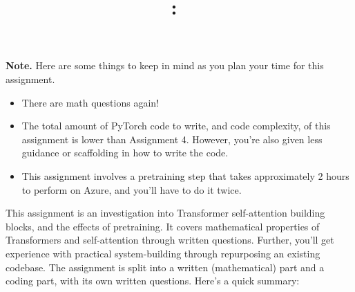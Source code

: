 \documentclass[answers]{exam}
\title{
    \textmd{\textbf{\hmwkClass:\ \hmwkTitle}}
}
\author{}
\date{}
\begin{document}
    \vspace{-1in}

    \maketitle

    \vspace{-0.5in}


    \begin{framed}
        \noindent
        \textbf{Note.} Here are some things to keep in mind as you plan your time for this assignment.
        \begin{itemize}
            \item There are math questions again!
            \item The total amount of PyTorch code to write, and code complexity, of this assignment is lower than Assignment 4.
            However, you're also given less guidance or scaffolding in how to write the code.
            \item  This assignment involves a pretraining step that takes approximately 2 hours to perform on Azure, and you'll have to do it twice.
        \end{itemize}
    \end{framed}
    This assignment is an investigation into Transformer self-attention building blocks, and the effects of pretraining.
    It covers mathematical properties of Transformers and self-attention through written questions.
    Further, you'll get experience with practical system-building through repurposing an existing codebase.
    The assignment is split into a written (mathematical) part and a coding part, with its own written questions.
    Here's a quick summary:
\end{document}
